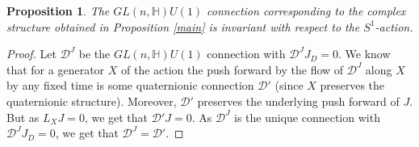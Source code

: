 \documentclass[10pt,a4paper]{amsart}
\newtheorem{prop}{Proposition}
\begin{document}
\begin{prop}\label{con}
    The $GL(n,\mathbb{H})U(1)$ connection corresponding to the complex structure obtained in  Proposition \ref{main} is invariant with respect to the $S^1$-action.
\end{prop}

\begin{proof}
  Let $\mathcal{D}^J$ be the $GL(n,\mathbb{H})U(1)$ connection with $\mathcal{D}^J J_D=0$. We know that for a generator $X$ of the action the push forward by the flow of $\mathcal{D}^J$ along $X$ by any fixed time  is some quaternionic connection $\mathcal{D}'$ (since $X$ preserves the quaternionic structure). Moreover, $\mathcal{D}'$ preserves the underlying push forward of $J$.  But as $L_XJ=0$, we get that  $\mathcal{D}'J=0$. As  $\mathcal{D}^J$ is the unique connection with  $\mathcal{D}^J J_D=0$, we get that  $\mathcal{D}^J =\mathcal{D}'$. 
\end{proof}
\end{document}
